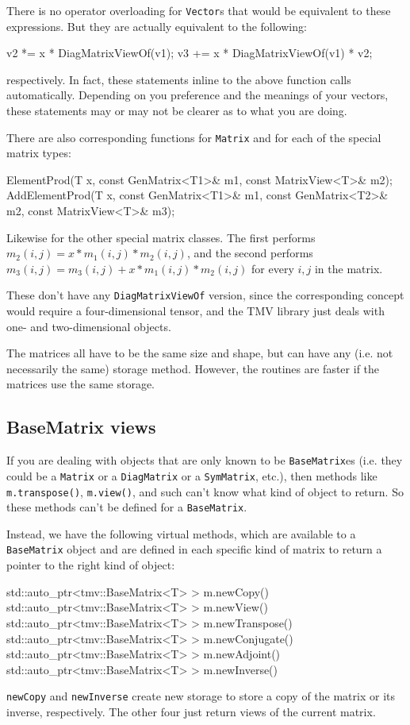 \documentclass[twoside,letterpaper,11pt]{article}
\renewcommand{\tt}[1]{{\lstinline {#1}}}
\begin{document}
There is no operator overloading for \tt{Vector}s that would be equivalent to 
these expressions.
But they are actually equivalent to the following:
\begin{tmvcode}
v2 *= x * DiagMatrixViewOf(v1);
v3 += x * DiagMatrixViewOf(v1) * v2;
\end{tmvcode}
respectively.  In fact, these statements inline to the above function calls
automatically.  Depending on you preference and the meanings of your vectors,
these statements may or may not be clearer as to what you are doing.

There are also corresponding functions for \tt{Matrix} and for each of the special
matrix types:
\begin{tmvcode}
ElementProd(T x, const GenMatrix<T1>& m1, const MatrixView<T>& m2);
AddElementProd(T x, const GenMatrix<T1>& m1, const GenMatrix<T2>& m2,
      const MatrixView<T>& m3);
\end{tmvcode}
Likewise for the other special matrix classes.  The first performs 
$m_2(i,j) = x * m_1(i,j) * m_2(i,j)$, and the second performs
$m_3(i,j) = m_3(i,j) + x * m_1(i,j) * m_2(i,j)$ for every $i,j$ in the matrix.

These don't have any \tt{DiagMatrixViewOf} version, since the corresponding 
concept would require a four-dimensional tensor, and the TMV library
just deals with one- and two-dimensional objects.

The matrices all have to be the same size and shape, but can have any 
(i.e. not necessarily the same) storage method.  However, the routines are faster
if the matrices use the same storage.

\subsection{BaseMatrix views}
\label{BaseMatrixViews}

If you are dealing with objects that are only known to be \tt{BaseMatrix}es
(i.e. they could be a \tt{Matrix} or a \tt{DiagMatrix} or a \tt{SymMatrix}, etc.),
then methods like \tt{m.transpose()}, \tt{m.view()}, and such
can't know what kind of object to return.
So these methods can't be defined for a \tt{BaseMatrix}.  

Instead, we have the following virtual methods, 
which are available to a \tt{BaseMatrix}
object and are defined in each specific kind of matrix to return a pointer
to the right kind of object:
\begin{tmvcode}
std::auto_ptr<tmv::BaseMatrix<T> > m.newCopy()
std::auto_ptr<tmv::BaseMatrix<T> > m.newView()
std::auto_ptr<tmv::BaseMatrix<T> > m.newTranspose()
std::auto_ptr<tmv::BaseMatrix<T> > m.newConjugate()
std::auto_ptr<tmv::BaseMatrix<T> > m.newAdjoint()
std::auto_ptr<tmv::BaseMatrix<T> > m.newInverse()
\end{tmvcode}
\tt{newCopy} and \tt{newInverse} create new storage to store a copy of the 
matrix or its inverse, respectively.  The other four just return views of the current 
matrix.
\end{document}
